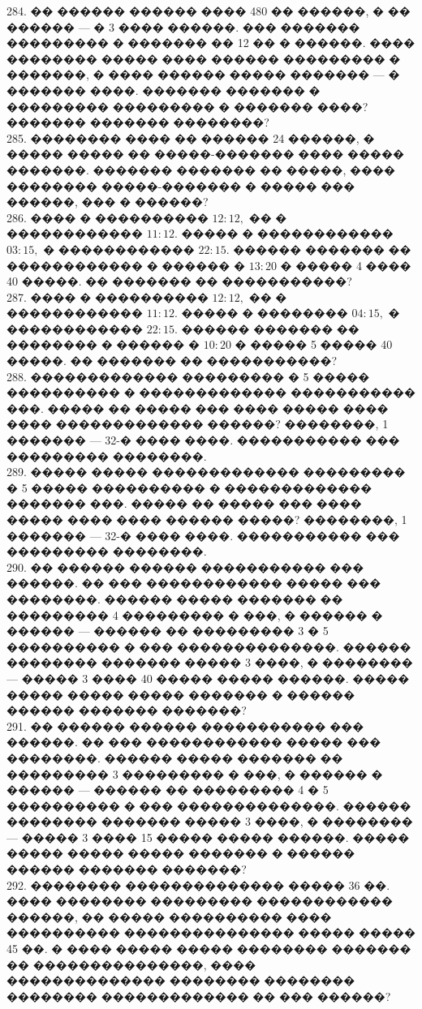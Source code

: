 \documentclass[12pt]{article}
\begin{document}
284. �� ������ ������ ���� 480 �� ������, � �� ������ --- � 3 ���� ������. ��� ������� ��������� � ������� �� 12 �� � ������. ���� �������� ����� ���� ������ ��������� � �������, � ���� ������ ����� ������� --- � ������� ����. ������� ������� � ��������� ��������� � ������� ����? ������� ������� ��������?\\
285. �������� ���� �� ������ 24 ������, � ����� ����� �� �����-������� ���� ����� �������. ������� ������� �� �����, ���� �������� �����-������� � ����� ��� ������, ��� � ������?\\
286. ���� � ���������� $12:12,$ �� � ������������ $11:12.$ ����� � ������������ $03:15,$ � ������������ $22:15.$ ������ ������� �� ������������ � ������ � $13:20$ � ����� 4 ���� 40 �����. �� ������� �� �����������?\\
287. ���� � ���������� $12:12,$ �� � ������������ $11:12.$ ����� � �������� $04:15,$ � ������������ $22:15.$ ������ ������� �� �������� � ������ � $10:20$ � ����� 5 ����� 40 �����. �� ������� �� �����������?\\
288. ������������� ��������� � 5 ����� ���������� � ������������� ����������� ���. ����� �� ����� ��� ���� ����� ���� ���� ������������� ������? ��������, 1 ������� --- 32-� ���� ����. ����������� ��� ��������� ��������.\\
289. ����� ����� ������������� ��������� � 5 ����� ���������� � ������������� ������� ���. ����� �� ����� ��� ���� ����� ���� ���� ������ �����? ��������, 1 ������� --- 32-� ���� ����. ����������� ��� ��������� ��������.\\
290. �� ������ ������ ����������� ��� ������. �� ��� ������������ ����� ��� ��������. ������ ����� ������� �� ��������� 4 ��������� � ���, � ������ � ������ --- ������ �� ��������� 3 � 5 ���������� � ��� ��������������. ������ �������� ������� ����� 3 ����, � �������� --- ����� 3 ���� 40 ����� ����� ������. ����� ����� ����� ����� ������� � ������ ������ ������� �������?\\
291. �� ������ ������ ����������� ��� ������. �� ��� ������������ ����� ��� ��������. ������ ����� ������� �� ��������� 3 ��������� � ���, � ������ � ������ --- ������ �� ��������� 4 � 5 ���������� � ��� ��������������. ������ �������� ������� ����� 3 ����, � �������� --- ����� 3 ���� 15 ����� ����� ������. ����� ����� ����� ����� ������� � ������ ������ ������� �������?\\
292. �������� �������������� ����� 36 ��. ���� �������� ��������� ������������ ������, �� ����� ���������� ���� ���������� ��������������� ����� ����� 45 ��. � ���� ����� ����� �������� ������� �� ���������������, ���� �������������� �������� �������� �������� ������������� �� ��� ������?\\
\end{document}
